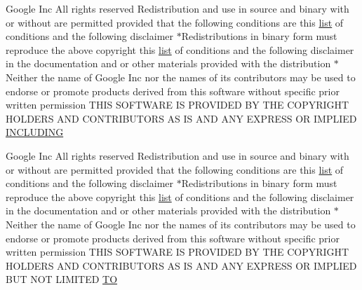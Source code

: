 \begin{DoxyCompactItemize}
Google Inc All rights reserved Redistribution and use in source and binary with or without are permitted provided that the following conditions are this \hyperlink{CMakeLists_8txt_a548e427ae9357a6f3536cff3ca23efda}{list} of conditions and the following disclaimer $\ast$Redistributions in binary form must reproduce the above copyright this \hyperlink{CMakeLists_8txt_a548e427ae9357a6f3536cff3ca23efda}{list} of conditions and the following disclaimer in the documentation and or other materials provided with the distribution $\ast$Neither the name of Google Inc nor the names of its contributors may be used to endorse or promote products derived from this software without specific prior written permission T\+H\+IS S\+O\+F\+T\+W\+A\+RE IS P\+R\+O\+V\+I\+D\+ED BY T\+HE C\+O\+P\+Y\+R\+I\+G\+HT H\+O\+L\+D\+E\+RS A\+ND C\+O\+N\+T\+R\+I\+B\+U\+T\+O\+RS AS IS A\+ND A\+NY E\+X\+P\+R\+E\+SS OR I\+M\+P\+L\+I\+ED \hyperlink{COPYING_8txt_ab1928ef22d7c2011aca3b1e59ca80596}{I\+N\+C\+L\+U\+D\+I\+NG}
\item 
Google Inc All rights reserved Redistribution and use in source and binary with or without are permitted provided that the following conditions are this \hyperlink{CMakeLists_8txt_a548e427ae9357a6f3536cff3ca23efda}{list} of conditions and the following disclaimer $\ast$Redistributions in binary form must reproduce the above copyright this \hyperlink{CMakeLists_8txt_a548e427ae9357a6f3536cff3ca23efda}{list} of conditions and the following disclaimer in the documentation and or other materials provided with the distribution $\ast$Neither the name of Google Inc nor the names of its contributors may be used to endorse or promote products derived from this software without specific prior written permission T\+H\+IS S\+O\+F\+T\+W\+A\+RE IS P\+R\+O\+V\+I\+D\+ED BY T\+HE C\+O\+P\+Y\+R\+I\+G\+HT H\+O\+L\+D\+E\+RS A\+ND C\+O\+N\+T\+R\+I\+B\+U\+T\+O\+RS AS IS A\+ND A\+NY E\+X\+P\+R\+E\+SS OR I\+M\+P\+L\+I\+ED B\+UT N\+OT L\+I\+M\+I\+T\+ED \hyperlink{COPYING_8txt_a4b42230e232228783545c1173b0ac51d}{TO}
\item 

\end{DoxyCompactItemize}
